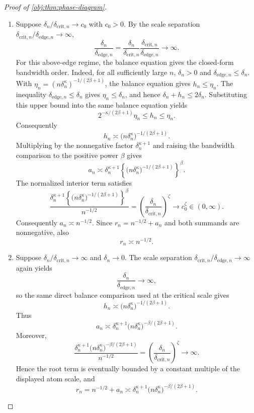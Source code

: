 \documentclass[11pt]{article}
\begin{document}
\begin{proof}[Proof of \cref{obj:thm:phase-diagram}]
\begin{enumerate}
\item Suppose \(\delta_n/\delta_{\mathrm{crit},n}\to c_0\) with \(c_0>0\).
By the scale separation \(\delta_{\mathrm{crit},n}/\delta_{\mathrm{edge},n}\to\infty\),
\[
\frac{\delta_n}{\delta_{\mathrm{edge},n}}
=
\frac{\delta_n}{\delta_{\mathrm{crit},n}}
\frac{\delta_{\mathrm{crit},n}}{\delta_{\mathrm{edge},n}}
\to\infty .
\]
For this above-edge regime, the balance equation gives the closed-form bandwidth
order.  Indeed, for all sufficiently large \(n\),
\(\delta_n>0\) and \(\delta_{\mathrm{edge},n}\le\delta_n\).  With
\(\eta_n=(n\delta_n^\kappa)^{-1/(2\beta+1)}\), the balance equation gives
\(h_n\le \eta_n\).  The inequality \(\delta_{\mathrm{edge},n}\le\delta_n\) gives
\(\eta_n\le\delta_n\), and hence \(\delta_n+h_n\le2\delta_n\).  Substituting this
upper bound into the same balance equation yields
\[
2^{-\kappa/(2\beta+1)} \eta_n\le h_n\le \eta_n .
\]
Consequently
\[
h_n\asymp \bigl(n\delta_n^\kappa\bigr)^{-1/(2\beta+1)} .
\]
Multiplying by the nonnegative factor \(\delta_n^{\kappa+1}\) and raising the
bandwidth comparison to the positive power \(\beta\) gives
\[
a_n\asymp
\delta_n^{\kappa+1}
\left\{\bigl(n\delta_n^\kappa\bigr)^{-1/(2\beta+1)}\right\}^{\beta}.
\]
The normalized interior term satisfies
\[
\frac{
\delta_n^{\kappa+1}
\left\{\bigl(n\delta_n^\kappa\bigr)^{-1/(2\beta+1)}\right\}^{\beta}
}{n^{-1/2}}
=
\left(\frac{\delta_n}{\delta_{\mathrm{crit},n}}\right)^\zeta
\to c_0^\zeta\in(0,\infty).
\]
Consequently \(a_n\asymp n^{-1/2}\).  Since
\(r_n=n^{-1/2}+a_n\) and both summands are nonnegative, also
\[
r_n\asymp n^{-1/2}.
\]

\item Suppose \(\delta_n/\delta_{\mathrm{crit},n}\to\infty\) and
\(\delta_n\to0\).  The scale separation
\(\delta_{\mathrm{crit},n}/\delta_{\mathrm{edge},n}\to\infty\) again yields
\[
\frac{\delta_n}{\delta_{\mathrm{edge},n}}\to\infty,
\]
so the same direct balance comparison used at the critical scale gives
\[
h_n\asymp \bigl(n\delta_n^\kappa\bigr)^{-1/(2\beta+1)} .
\]
Thus
\[
a_n\asymp
\delta_n^{\kappa+1}
\bigl(n\delta_n^\kappa\bigr)^{-\beta/(2\beta+1)} .
\]
Moreover,
\[
\frac{
\delta_n^{\kappa+1}
\bigl(n\delta_n^\kappa\bigr)^{-\beta/(2\beta+1)}
}{n^{-1/2}}
=
\left(\frac{\delta_n}{\delta_{\mathrm{crit},n}}\right)^\zeta
\to\infty .
\]
Hence the root term is eventually bounded by a constant multiple of the
displayed atom scale, and
\[
r_n
=
n^{-1/2}+a_n
\asymp
\delta_n^{\kappa+1}
\bigl(n\delta_n^\kappa\bigr)^{-\beta/(2\beta+1)} .
\]


\end{enumerate}
\end{proof}
\end{document}

